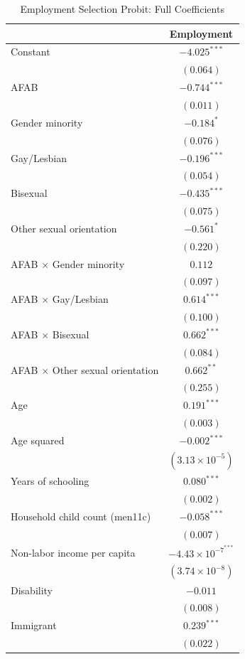 \begin{table}[htpb]
\caption{Employment Selection Probit: Full Coefficients}
\label{tab:wages_selection_full_expr}
\centering
\begin{tabular}{l c}
\hline
 & Employment \\
\hline
Constant & $-4.025^{***}$ \\
 & $(0.064)$ \\
AFAB & $-0.744^{***}$ \\
 & $(0.011)$ \\
Gender minority & $-0.184^{*}$ \\
 & $(0.076)$ \\
Gay/Lesbian & $-0.196^{***}$ \\
 & $(0.054)$ \\
Bisexual & $-0.435^{***}$ \\
 & $(0.075)$ \\
Other sexual orientation & $-0.561^{*}$ \\
 & $(0.220)$ \\
AFAB $\times$ Gender minority & $0.112$ \\
 & $(0.097)$ \\
AFAB $\times$ Gay/Lesbian & $0.614^{***}$ \\
 & $(0.100)$ \\
AFAB $\times$ Bisexual & $0.662^{***}$ \\
 & $(0.084)$ \\
AFAB $\times$ Other sexual orientation & $0.662^{**}$ \\
 & $(0.255)$ \\
Age & $0.191^{***}$ \\
 & $(0.003)$ \\
Age squared & $-0.002^{***}$ \\
 & $(3.13\times 10^{-5})$ \\
Years of schooling & $0.080^{***}$ \\
 & $(0.002)$ \\
Household child count (men11c) & $-0.058^{***}$ \\
 & $(0.007)$ \\
Non-labor income per capita & $-4.43\times 10^{-7}^{***}$ \\
 & $(3.74\times 10^{-8})$ \\
Disability & $-0.011$ \\
 & $(0.008)$ \\
Immigrant & $0.239^{***}$ \\
 & $(0.022)$ \\

\end{tabular}
\end{table}

